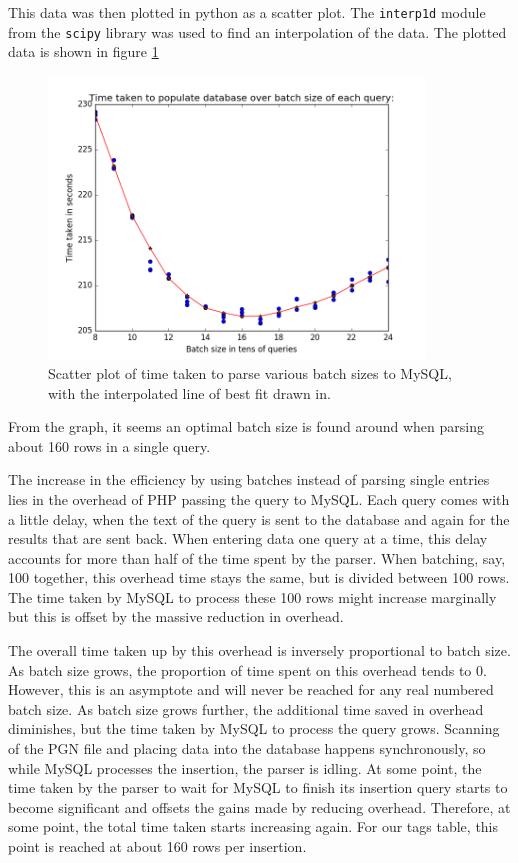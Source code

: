 \documentclass{article}
\begin{document}
This data was then plotted in python as a scatter plot.  The \texttt{interp1d}
module from the \texttt{scipy} library was used to find an interpolation of
the data.  The plotted data is shown in figure \ref{figure:1}

\begin{figure}[h]
	\includegraphics[width=10cm]{graph_batch_interpolation}
	\caption{Scatter plot of time taken to parse various batch sizes to
	MySQL, with the interpolated line of best fit drawn in.}
	\label{figure:1}
\end{figure}

From the graph, it seems an optimal batch size is found around when parsing
about 160 rows in a single query.

The increase in the efficiency by using batches instead of parsing single
entries lies in the overhead of PHP passing the query to MySQL.  Each
query comes with a little delay, when the text of the query is sent to the
database and again for the results that are sent back.  When entering data
one query at a time, this delay accounts for more than half of the time spent
by the parser.  When batching, say, 100 together, this overhead time stays
the same, but is divided between 100 rows.  The time taken by MySQL to
process these 100 rows might increase marginally but this is offset by the
massive reduction in overhead.

The overall time taken up by this overhead is inversely proportional to
batch size.  As batch size grows, the proportion of time spent on this
overhead tends to 0. However, this is an asymptote and will never be reached
for any real numbered batch size.  As batch size grows further, the additional
time saved in overhead diminishes, but the time taken by MySQL to process the
query grows.  Scanning of the PGN file and placing data into the database
happens synchronously, so while MySQL processes the insertion, the parser is
idling.  At some point, the time taken by the parser to wait for MySQL to
finish its insertion query starts to become significant and offsets the
gains made by reducing overhead.  Therefore, at some point, the total time
taken starts increasing again.  For our tags table, this point is reached
at about 160 rows per insertion.
\end{document}
